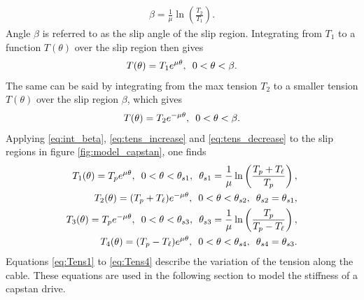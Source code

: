 \begin{align} 
\beta = \frac{1}{\mu}\ln\left(\frac{T_2}{T_1}\right).
\label{eq:int_beta}
\end{align}
Angle $\beta$ is referred to as the slip angle of the slip region. Integrating from $T_1$ to a function $T(\theta)$ over the slip region then gives \begin{align}
T(\theta) = T_1e^{\mu\theta},\hquad 0<\theta<\beta.\label{eq:tens_increase}
\end{align}
The same can be said by integrating from the max tension $T_2$ to a smaller tension $T(\theta)$ over the slip region $\beta$, which gives
\begin{align}
T(\theta) = T_2e^{-\mu\theta},\hquad 0<\theta<\beta.\label{eq:tens_decrease}
\end{align}
Applying \eqref{eq:int_beta}, \eqref{eq:tens_increase} and \eqref{eq:tens_decrease} to the slip regions in figure \ref{fig:model_capstan}, one finds
\begin{align}
    T_1(\theta) = T_pe^{\mu\theta},\hquad 0<\theta<\theta_{s1},\hquad \theta_{s1} = \frac{1}{\mu}\ln\left(\frac{T_p+T_\ell}{T_p}\right),\label{eq:Tens1}\\
    T_2(\theta) = (T_p+T_\ell)e^{-\mu\theta},\hquad 0<\theta<\theta_{s2},\hquad \theta_{s2}=\theta_{s1},\label{eq:Tens2}\\
    T_3(\theta) = T_pe^{-\mu\theta},\hquad 0<\theta<\theta_{s3},\hquad \theta_{s3} = \frac{1}{\mu}\ln\left(\frac{T_p}{T_p-T_\ell}\right),\label{eq:Tens3}\\
    T_4(\theta) = (T_p-T_\ell)e^{\mu\theta},\hquad 0<\theta<\theta_{s4},\hquad \theta_{s4} = \theta_{s3}.\label{eq:Tens4}
\end{align}
Equations \eqref{eq:Tens1} to \eqref{eq:Tens4} describe the variation of the tension along the cable. These equations are used in the following section to model the stiffness of a capstan drive.
